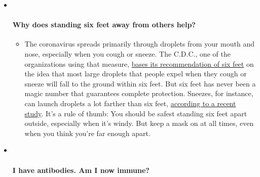 \begin{itemize}
\item ~
  \hypertarget{why-does-standing-six-feet-away-from-others-help}{%
  \paragraph{Why does standing six feet away from others
  help?}\label{why-does-standing-six-feet-away-from-others-help}}

  \begin{itemize}
  \tightlist
  \item
    The coronavirus spreads primarily through droplets from your mouth
    and nose, especially when you cough or sneeze. The C.D.C., one of
    the organizations using that measure,
    \href{https://www.nytimes.com/2020/04/14/health/coronavirus-six-feet.html?action=click\&pgtype=Article\&state=default\&region=MAIN_CONTENT_3\&context=storylines_faq}{bases
    its recommendation of six feet} on the idea that most large droplets
    that people expel when they cough or sneeze will fall to the ground
    within six feet. But six feet has never been a magic number that
    guarantees complete protection. Sneezes, for instance, can launch
    droplets a lot farther than six feet,
    \href{https://jamanetwork.com/journals/jama/fullarticle/2763852}{according
    to a recent study}. It's a rule of thumb: You should be safest
    standing six feet apart outside, especially when it's windy. But
    keep a mask on at all times, even when you think you're far enough
    apart.
  \end{itemize}
\item ~
  \hypertarget{i-have-antibodies-am-i-now-immune}{%
  \paragraph{I have antibodies. Am I now
  immune?}\label{i-have-antibodies-am-i-now-immune}}


\end{itemize}
